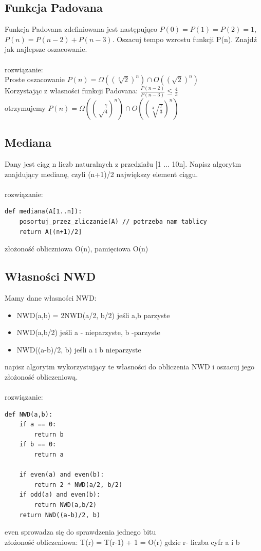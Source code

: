 \documentclass{article}
\begin{document}
\subsection*{Funkcja Padovana}
Funkcja Padovana zdefiniowana jest następująco $P(0) = P(1) = P(2) = 1$,  $P(n) = P(n-2) + P(n-3)$.  
Oszacuj tempo wzrostu funkcji P(n). Znajdź jak najlepsze oszacowanie.  \\\\rozwiązanie: \\
Proste oszacowanie $P(n) = \Omega((\sqrt[3] 2)^n) \cap O((\sqrt 2)^n)$ \\
Korzystając z własności funkcji Padovana: $\frac{P(n-2)}{P(n-3)} \leq \frac{4}{3}$ \\
otrzymujemy $P(n) = \Omega((\sqrt \frac{7}{4})^n) \cap O((\sqrt[3]{ \frac{7}{3}} )^n)$

\subsection*{Mediana}
Dany jest ciąg n liczb naturalnych z przedziału [1 ... 10n]. Napisz algorytm znajdujący medianę, czyli (n+1)/2 największy element ciągu. \\\\rozwiązanie:\\
\begin{lstlisting}
def mediana(A[1..n]):
	posortuj_przez_zliczanie(A) // potrzeba nam tablicy 
	return A[(n+1)/2]
\end{lstlisting}

złożoność obliczniowa O(n), pamięciowa O(n)

\subsection*{Własności NWD}
Mamy dane własności NWD:
\begin{itemize}
	\item NWD(a,b) = 2NWD(a/2, b/2) jeśli a,b parzyste
	\item NWD(a,b/2) jeśli a - nieparzyste, b -parzyste
	\item NWD((a-b)/2, b) jeśli a i b nieparzyste
\end{itemize}
napisz algorytm wykorzystujący te własności do obliczenia NWD i oszacuj jego złożoność obliczeniową. \\\\rozwiązanie:\\

\begin{lstlisting}
def NWD(a,b):
	if a == 0:
		return b
	if b == 0:
		return a	

	if even(a) and even(b):
		return 2 * NWD(a/2, b/2)
	if odd(a) and even(b):
		return NWD(a,b/2)
	return NWD((a-b)/2, b)
\end{lstlisting}
even sprowadza się do sprawdzenia jednego bitu \\
złożoność obliczeniowa: T(r) = T(r-1) + 1 = O(r) gdzie r- liczba cyfr a i b 
\end{document}
